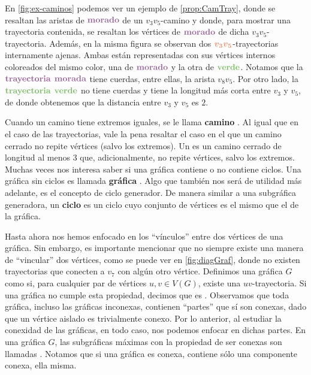 En \cref{fig:ex-caminos} podemos ver un ejemplo de \cref{prop:CamTray}, donde se
resaltan las aristas de ${\color{morado}\bf {morado}}$ de un $v_3 v_5$-camino y
donde, para mostrar una trayectoria contenida, se resaltan los v\'ertices de
${\color{morado}\textbf{morado}}$ de dicha $v_3 v_5$-trayectoria.
Adem\'as, en la misma figura se observan dos ${\color{coral}\boldsymbol
{v_3 v_5}}$-trayectorias internamente ajenas. Ambas est\'an representadas con
sus v\'ertices internos coloreados del mismo color, una de ${\color{morado}\bf
{morado}}$ y la otra de ${\color{verde}\bf {verde}}$. Notamos que la
${\color{morado}\bf{trayectoria}}$ ${\color{morado}\bf {morada}}$ tiene cuerdas,
entre ellas, la arista $v_8v_5$. Por otro lado, la
${\color{verde}\bf{trayectoria}}$ ${\color{verde}\bf {verde}}$ no tiene cuerdas
y tiene la longitud m\'as corta entre $v_3$ y $v_5$, de donde obtenemos que la
distancia entre $v_3$ y $v_5$ es $2$.

Cuando un camino tiene extremos iguales, se le llama \textbf{camino}
. Al igual que en el caso de las trayectorias, vale
la pena resaltar el caso en el que un camino cerrado no repite v\'ertices (salvo
los extremos). Un  es un camino cerrado de longitud al menos $3$
que, adicionalmente, no repite v\'ertices, salvo los extremos.  Muchas veces nos
interesa saber si una gr\'afica contiene o no contiene ciclos. Una gr\'afica sin
ciclos es llamada \textbf{gr\'afica} . Algo que
tambi\'en nos ser\'a de utilidad m\'as adelante, es el concepto de ciclo
generador. De manera similar a una subgr\'afica generadora, un \textbf{ciclo}
 es un ciclo cuyo conjunto de v\'ertices es el mismo
que el de la gr\'afica.
   
Hasta ahora nos hemos enfocado en los ``v\'inculos'' entre dos v\'ertices de una
gr\'afica. Sin embargo, es importante mencionar que no siempre existe una manera
de ``vincular'' dos v\'ertices, como se puede ver en \cref{fig:diagGraf}, donde
no existen trayectorias que conecten a $v_7$ con alg\'un otro v\'ertice.
Definimos una gr\'afica $G$ como
 si, para cualquier par de
v\'ertices $u,v \in V(G)$, existe una $uv$-trayectoria. Si una gr\'afica no
cumple esta propiedad, decimos que es .
Observamos que toda gr\'afica, incluso las gr\'aficas inconexas, contienen
``partes'' que s\'i son conexas, dado que un v\'ertice aislado es trivialmente
conexo. Por lo anterior, al estudiar la conexidad de las gr\'aficas, en todo
caso, nos podemos enfocar en dichas partes. En una gr\'afica $G$, las
subgr\'aficas m\'aximas con la propiedad de ser conexas son llamadas
. Notamos que si una
gr\'afica es conexa, contiene s\'olo una componente conexa, ella misma.

